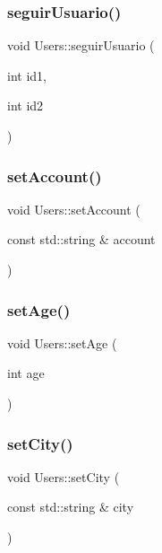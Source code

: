 \mbox{\label{class_users_a0ae24caea62365afea1a7cccf7513cc1}} 
\subsubsection{\texorpdfstring{seguir\+Usuario()}{seguirUsuario()}}
{\footnotesize\ttfamily void Users\+::seguir\+Usuario (\begin{DoxyParamCaption}\item[{int}]{id1,  }\item[{int}]{id2 }\end{DoxyParamCaption})}

\mbox{\label{class_users_a2317c0ff6787563b72a5fb5a22611edd}} 
\subsubsection{\texorpdfstring{set\+Account()}{setAccount()}}
{\footnotesize\ttfamily void Users\+::set\+Account (\begin{DoxyParamCaption}\item[{const std\+::string \&}]{account }\end{DoxyParamCaption})}

\mbox{\label{class_users_a2e6c1406a9ccb2f23cd4691ff9162ab3}} 
\subsubsection{\texorpdfstring{set\+Age()}{setAge()}}
{\footnotesize\ttfamily void Users\+::set\+Age (\begin{DoxyParamCaption}\item[{int}]{age }\end{DoxyParamCaption})}

\mbox{\label{class_users_a4bcea5e8c632f33e503026e461790edc}} 
\subsubsection{\texorpdfstring{set\+City()}{setCity()}}
{\footnotesize\ttfamily void Users\+::set\+City (\begin{DoxyParamCaption}\item[{const std\+::string \&}]{city }\end{DoxyParamCaption})}

